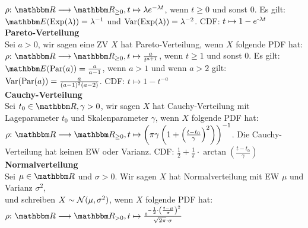     \(\rho \QDp \R \longrightarrow \R_{\ge 0}, t \mapsto \lambda e^{-\lambda t}\), wenn \(t \ge 0\) und sonst \(0\). Es gilt: \(\Ew(\Exp(\lambda)) = \lambda^{-1}\) und \(\text{Var}(\text{Exp}(\lambda)) = \lambda^{-2}\). CDF: \(t \mapsto 1 - e^{\text{-} \lambda t}\) \\
    \textbf{Pareto-Verteilung}\\
    Sei \(a > 0\), wir sagen eine ZV \(X\) hat Pareto-Verteilung, wenn \(X\) folgende PDF hat:
    \(\rho \QDp \R \longrightarrow \R_{\ge 0}, t \mapsto \frac{a}{t^{a+1}}\), wenn \(t \ge 1\) und sonst \(0\). Es gilt: \(\Ew(\text{Par}(a)) = \frac{a}{a-1}\), wenn \(a > 1\) und wenn \(a > 2\) gilt: \(\text{Var}(\text{Par}(a)) = \frac{a}{(a-1)^2(a-2)}\). CDF: \(t \mapsto 1 - t^{-a}\) \\
    \textbf{Cauchy-Verteilung}\\
    Sei \(t_0 \in \R, \gamma > 0\), wir sagen \(X\) hat Cauchy-Verteilung mit Lageparameter \(t_0\) und Skalenparameter \(\gamma\), wenn \(X\) folgende PDF hat:
    \(\rho \QDp \R \longrightarrow \R_{\ge 0}, t \mapsto \left(\pi \gamma \left(1+\left(\frac{t-t_0}{\gamma}\right)^2\right)\right)^{-1}\). Die Cauchy-Verteilung hat keinen EW oder Varianz. CDF: \(\frac{1}{2} + \frac{1}{\pi} \cdot \arctan\left(\frac{t-t_0}{\gamma}\right)\) \\
    \textbf{Normalverteilung}\\
    Sei \(\mu \in \R\) und \(\sigma > 0\). Wir sagen \(X\) hat Normalverteilung mit EW \(\mu\) und Varianz \(\sigma^2\),\\
    und schreiben \(X \sim \mathcal{N}(\mu, \sigma^2)\), wenn \(X\) folgende PDF hat:
    \(\rho \QDp \R \longrightarrow \R_{> 0}, t \mapsto \frac{e^{-\frac{1}{2}\cdot\left(\frac{t {-} \mu}{\sigma}\right)^2}}{\sqrt{2\pi} \cdot \sigma}\)
\pagebreak \\
